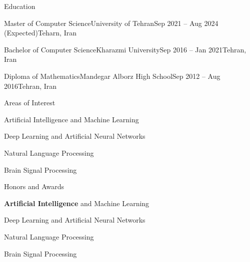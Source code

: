 \documentclass[]{main}
\begin{document}
\resumeheader
{}
{}
{}
{}
{}
{}

\begin{section}{Education}
 \begin{subsectionnobullet}{Master of Computer Science}{University of Tehran}{Sep 2021 -- Aug 2024 (Expected)}{Teharn, Iran}
 \end{subsectionnobullet}

 \begin{subsectionnobullet}{Bachelor of Computer Science}{Kharazmi University}{Sep 2016 -- Jan 2021}{Tehran, Iran}
 \end{subsectionnobullet}

 \begin{subsectionnobullet}{Diploma of Mathematics}{Mandegar Alborz High School}{Sep 2012 -- Aug 2016}{Tehran, Iran}
 \end{subsectionnobullet}
\end{section}

\begin{section}{Areas of Interest}
 \begin{subsectionbullet}
     \item Artificial Intelligence and Machine Learning
     \item Deep Learning and Artificial Neural Networks
     \item Natural Language Processing
     \item Brain Signal Processing
 \end{subsectionbullet}
\end{section}

\begin{section}{Honors and Awards}
 \begin{subsectionbullet}
     \item \textbf{Artificial Intelligence} and Machine Learning
     \item Deep Learning and Artificial Neural Networks
     \item Natural Language Processing
     \item Brain Signal Processing
 \end{subsectionbullet}
\end{section}
\end{document}
